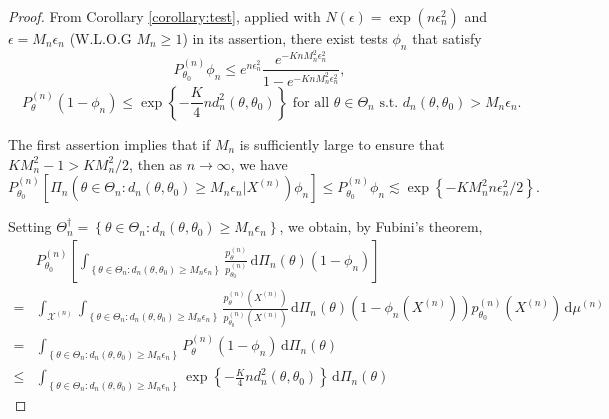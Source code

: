 \documentclass[11pt]{article}
\theoremstyle{plain}
\theoremstyle{definition}
\theoremstyle{remark}
\begin{document}
\begin{proof}
    From Corollary \ref{corollary:test}, applied with $N(\epsilon) = \exp\left( n\epsilon_n^2 \right)$ and $\epsilon = M_n \epsilon_n$ (W.L.O.G $M_n \geq 1$) in its assertion, there exist tests $\phi_n$ that satisfy 
    \begin{equation*}
        P_{\theta_0}^{(n)} \phi_n 
        \leq
        e^{n \epsilon_n^2} \frac{e^{-K n M_n^2 \epsilon_n^2}}{1-e^{-K n M_n^2 \epsilon_n^2}}
        ,
    \end{equation*}
    \begin{equation*}
        \quad 
        P_\theta^{(n)} (1-\phi_n) \leq \exp\left\{-\frac{K}{4}n d_n^2(\theta,\theta_0) \right\}
        \text{ for all $\theta\in \Theta_n$ s.t. $d_n(\theta,\theta_0)> M_n\epsilon_n$.}
    \end{equation*}

    The first assertion implies that if $M_n $ is sufficiently large to ensure that $KM_n^2 - 1 > KM_n^2/2$, then as $n \to \infty$, we have
    \begin{equation*}
        P_{\theta_0}^{(n)} \left[ \Pi_n \left( \theta \in \Theta_n : d_n (\theta, \theta_0) \geq M_n \epsilon_n | X^{(n)} \right) \phi_n \right]
        \leq P_{\theta_0}^{(n)} \phi_n \lesssim \exp\left\{ -K M_n^2 n \epsilon_n^2/2 \right\}. 
    \end{equation*}

    Setting $\Theta_{n}^\dagger = \left\{ \theta \in \Theta_n :  d_n (\theta, \theta_0) \geq M_n \epsilon_n  \right\}$, we obtain, by Fubini's theorem,
    \begin{align*}
        &P_{\theta_0}^{(n)} \left[ 
            \int_{
            \left\{ \theta \in \Theta_n :  d_n (\theta, \theta_0) \geq M_n \epsilon_n  \right\}
            } \frac{p_{\theta}^{(n)}}{p_{\theta_0}^{(n)}} 
            \, \mathrm d \Pi_n \left( \theta \right) \left(1- \phi_n\right)
        \right]
        \\
        =& 
        \int_{\mathcal X^{(n)}}\int_{
            \left\{ \theta \in \Theta_n :  d_n (\theta, \theta_0) \geq M_n \epsilon_n  \right\}
        } \frac{p_{\theta}^{(n)}(X^{(n)})}{p_{\theta_0}^{(n)}(X^{(n)})} 
            \, \mathrm d \Pi_n \left( \theta \right) \left(1- \phi_n(X^{(n)})\right)
p_{\theta_0}^{(n)}(X^{(n)})
            \, \mathrm d \mu^{(n)}
        \\
        =& 
        \int_{
            \left\{ \theta \in \Theta_n :  d_n (\theta, \theta_0) \geq M_n \epsilon_n  \right\}
        } {P_{\theta}^{(n)}(1-\phi_n)} 
            \, \mathrm d \Pi_n \left( \theta \right) 
        \\
        \leq
        & 
        \int_{
            \left\{ \theta \in \Theta_n :  d_n (\theta, \theta_0) \geq M_n \epsilon_n  \right\}
        } 
            \exp \left\{-\frac{K}{4}n d_n^2(\theta,\theta_0) \right\}
            \, \mathrm d \Pi_n \left( \theta \right) 
    \end{align*}


\end{proof}
\end{document}
